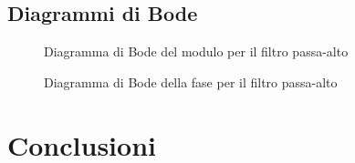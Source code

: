 \documentclass{article}
\begin{document}
\subsection{Diagrammi di Bode}

\begin{figure}[H]
  \caption{Diagramma di Bode del modulo per il filtro passa-alto}
\end{figure}
\begin{figure}[H]
  \caption{Diagramma di Bode della fase per il filtro passa-alto}
\end{figure}

\section{Conclusioni}
\end{document}

